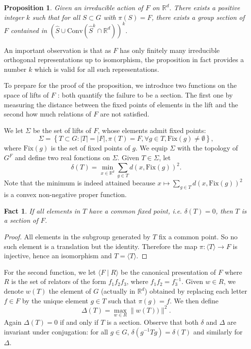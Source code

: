 \documentclass[11pt,leqno]{article}
\theoremstyle{plain}
\newtheorem{fact}[theorem]{Fact}
\newtheorem{proposition}[theorem]{Proposition}
\theoremstyle{definition}
\theoremstyle{remark}
\numberwithin{equation}{section}
\newcommand{\R}{\mathbb{R}}
\begin{document}




\begin{proposition}\label{prop:QuantSplit}
Given an irreducible action of $F$ on $\R^d$.
There exists  a positive integer $k$ such that for all $S\subset G$ with  $\pi(S)=F$, there exists a group section of $F$ contained in $(\widehat{S}\cup\mathrm{Conv}(\widehat{S}^{k}\cap \R^d))^k$. 
\end{proposition}

An important observation is that as $F$ has only finitely many irreducible orthogonal representations up to isomorphism, the proposition in fact provides a number $k$ which is valid for all such representations. 


To prepare for the proof of the proposition, we introduce two functions on the space of lifts of $F$ : both quantify the failure to be a section. The first one by measuring the distance between the fixed points of elements in the lift and the second how much relations of $F$ are not satisfied.

We let $\Sigma$ be the set of lifts of $F$, whose elements admit fixed points:
\[
\Sigma=\left\{ T \subset G : |T|=|F|, \pi(T)=F, \forall g \in T, \mathrm{Fix}(g)\neq \emptyset\right\},
\]
where $\text{Fix}(g)$ is the set of fixed points of $g$.
We equip $\Sigma$ with the topology of $G^F$ and define two real fonctions on $\Sigma$. Given $T\in \Sigma$, let 
\[
\delta(T)=\min_{x\in\R^d} \sum_{g\in T} d(x,\text{Fix}(g))^2.
\] 
Note that the minimum is indeed attained because $x\mapsto \sum_{g\in T} d(x,\text{Fix}(g))^2$ is a convex non-negative proper function. 

\begin{fact}\label{fact:delta}
If all elements in $T$ have a common fixed point, i.e. $\delta(T)=0$, then $T$ is a section of $F$.
\end{fact}

\begin{proof}
All elements in the subgroup generated by $T$ fix a common point. So no such element is a translation but the identity. Therefore the map $\pi:\langle T \rangle \to F$ is injective, hence an isomorphism and $T=\langle T\rangle$.
\end{proof}

For the second function, we let $\langle F\mid R\rangle$ be the canonical presentation of $F$ where $R$ is the set of relators of the form $f_1f_2f_3$, where $f_1f_2=f_3^{-1}$. Given $w\in R$, we denote $w(T)$ the element of $G$ (actually in $\R^d$) obtained by replacing each letter $f\in F$ by the unique element $g\in T$ such that $\pi(g)=f$.
We then define 
\[
\Delta(T)=\max_{w\in R}\|w(T))\|^2.
\]
Again $\Delta(T)=0$ if and only if $T$ is a section.
Observe that both $\delta$ and $\Delta$ are invariant under conjugation: for all $g\in G$, $\delta(g^{-1}Tg)=\delta(T)$ and similarly for $\Delta$.
\end{document}
